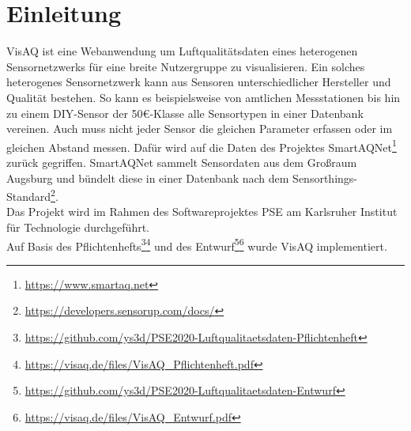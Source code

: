\section{Einleitung}
VisAQ ist eine Webanwendung um Luftqualitätsdaten eines heterogenen \gls{Sensor}netzwerks für eine breite Nutzergruppe zu visualisieren.
Ein solches heterogenes Sensornetzwerk kann aus Sensoren unterschiedlicher Hersteller und Qualität bestehen.
So kann es beispielsweise von amtlichen Messstationen bis hin zu einem DIY-Sensor der 50\euro-Klasse alle Sensortypen in einer Datenbank vereinen.
Auch muss nicht jeder Sensor die gleichen Parameter erfassen oder im gleichen Abstand messen.
Dafür wird auf die Daten des Projektes SmartAQNet\footnote{\url{https://www.smartaq.net}} zurück gegriffen.
SmartAQNet sammelt Sensordaten aus dem Großraum Augsburg und bündelt diese in einer Datenbank nach dem Sensorthings-Standard\footnote{\url{https://developers.sensorup.com/docs/}}.
\\
Das Projekt wird im Rahmen des Softwareprojektes PSE am Karlsruher Institut für Technologie durchgeführt.
\\
Auf Basis des Pflichtenhefts\footnote{\url{https://github.com/ys3d/PSE2020-Luftqualitaetsdaten-Pflichtenheft}}\footnote{\url{https://visaq.de/files/VisAQ_Pflichtenheft.pdf}} und des Entwurf\footnote{\url{https://github.com/ys3d/PSE2020-Luftqualitaetsdaten-Entwurf}}\footnote{\url{https://visaq.de/files/VisAQ_Entwurf.pdf}} wurde VisAQ implementiert.
\\
